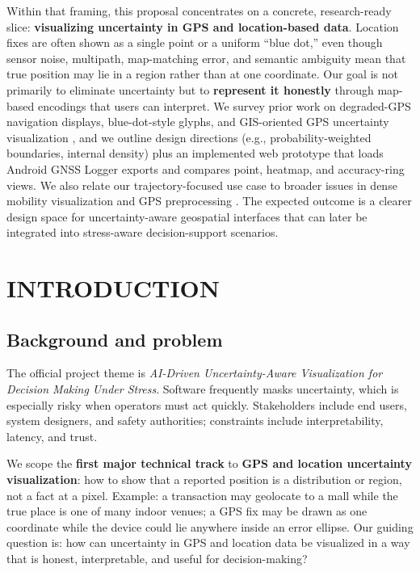 \documentclass[12pt,a4paper]{article}
\begin{document}
Within that framing, this proposal concentrates on a concrete, research-ready slice: \textbf{visualizing uncertainty in GPS and location-based data}. Location fixes are often shown as a single point or a uniform ``blue dot,'' even though sensor noise, multipath, map-matching error, and semantic ambiguity mean that true position may lie in a region rather than at one coordinate. Our goal is not primarily to eliminate uncertainty but to \textbf{represent it honestly} through map-based encodings that users can interpret. We survey prior work on degraded-GPS navigation displays, blue-dot-style glyphs, and GIS-oriented GPS uncertainty visualization \cite{ranasinghe2019visualising,burigat2011pedestrian,mckenzie2016assessing,hegarty2016where,lodha2002visualization}, and we outline design directions (e.g., probability-weighted boundaries, internal density) plus an implemented web prototype that loads Android GNSS Logger exports and compares point, heatmap, and accuracy-ring views. We also relate our trajectory-focused use case to broader issues in dense mobility visualization and GPS preprocessing \cite{Zheng2015,Sobral2019,Fadloun2022,Feng2021,MillardBall2019}. The expected outcome is a clearer design space for uncertainty-aware geospatial interfaces that can later be integrated into stress-aware decision-support scenarios.

\section{INTRODUCTION}

\subsection*{Background and problem}

The official project theme is \textit{AI-Driven Uncertainty-Aware Visualization for Decision Making Under Stress}. Software frequently masks uncertainty, which is especially risky when operators must act quickly. Stakeholders include end users, system designers, and safety authorities; constraints include interpretability, latency, and trust.

We scope the \textbf{first major technical track} to \textbf{GPS and location uncertainty visualization}: how to show that a reported position is a distribution or region, not a fact at a pixel. Example: a transaction may geolocate to a mall while the true place is one of many indoor venues; a GPS fix may be drawn as one coordinate while the device could lie anywhere inside an error ellipse. Our guiding question is: how can uncertainty in GPS and location data be visualized in a way that is honest, interpretable, and useful for decision-making?
\end{document}
